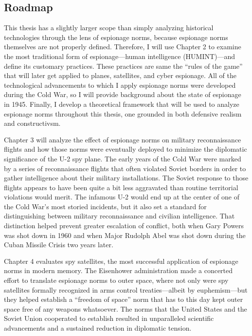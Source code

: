 \documentclass{memoir}
\begin{document}
\begin{refsegment}
\subsection{Roadmap}
This thesis has a slightly larger scope than simply analyzing historical technologies through the lens of espionage norms, because espionage norms themselves are not properly defined. Therefore, I will use Chapter 2 to examine the most traditional form of espionage---human intelligence (HUMINT)---and define its customary practices. These practices are same the ``rules of the game'' that will later get applied to planes, satellites, and cyber espionage. All of the technological advancements to which I apply espionage norms were developed during the Cold War, so I will provide background about the state of espionage in 1945. Finally, I develop a theoretical framework that will be used to analyze espionage norms throughout this thesis, one grounded in both defensive realism and constructivsm.

Chapter 3 will analyze the effect of espionage norms on military reconnaissance flights and how those norms were eventually deployed to minimize the diplomatic significance of the U-2 spy plane. The early years of the Cold War were marked by a series of reconnaissance flights that often violated Soviet borders in order to gather intelligence about their military installations. The Soviet response to those flights appears to have been quite a bit less aggravated than routine territorial violations would merit. The infamous U-2 would end up at the center of one of the Cold War's most storied incidents, but it also set a standard for distinguishing between military reconnaissance and civilian intelligence. That distinction helped prevent greater escalation of conflict, both when Gary Powers was shot down in 1960 and when Major Rudolph Abel was shot down during the Cuban Missile Crisis two years later.

Chapter 4 evaluates spy satellites, the most successful application of espionage norms in modern memory. The Eisenhower administration made a concerted effort to translate espionage norms to outer space, where not only were spy satellites formally recognized in arms control treaties---albeit by euphemism---but they helped establish a ``freedom of space'' norm that has to this day kept outer space free of any weapons whatsoever. The norms that the United States and the Soviet Union cooperated to establish resulted in unparalleled scientific advancements and a sustained reduction in diplomatic tension.


\end{refsegment}
\end{document}
